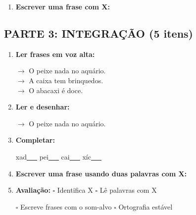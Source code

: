\begin{exercicio}
\begin{enumerate}[resume]
  \item \textbf{Escrever uma frase com X:}
  \begin{center}
  \underline{\hspace{12cm}}
  \end{center}

\end{enumerate}

\subsection*{PARTE 3: INTEGRAÇÃO (5 itens)}

\begin{enumerate}[resume]

  \item \textbf{Ler frases em voz alta:}
  \begin{center}
  $\rightarrow$ O peixe nada no aquário.\\
  $\rightarrow$ A caixa tem brinquedos.\\
  $\rightarrow$ O abacaxi é doce.\\
  \end{center}

  \item \textbf{Ler e desenhar:}
  \begin{center}
  $\rightarrow$ O peixe nada no aquário.
  \end{center}
  \begin{center}
  \end{center}

  \item \textbf{Completar:}
  \begin{center}
  xad\underline{~~~} \quad pei\underline{~~~} \quad cai\underline{~~~} \quad xíc\underline{~~~}
  \end{center}

  \item \textbf{Escrever uma frase usando duas palavras com X:}
  \begin{center}
  \underline{\hspace{12cm}}
  \end{center}

  \item \textbf{Avaliação:} $\square$ Identifica X \quad $\square$ Lê palavras com X
  \begin{center}
  $\square$ Escreve frases com o som-alvo \quad $\square$ Ortografia estável
  \end{center}


\end{enumerate}
\end{exercicio}
